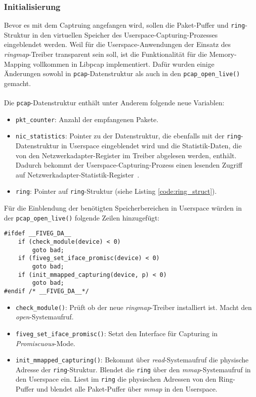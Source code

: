 \subsubsection*{Initialisierung}
Bevor es mit dem Captruing angefangen wird, sollen die Paket-Puffer und
\verb+ring+-Struktur in den virtuellen Speicher des
Userspace-Capturing-Prozesses eingeblendet werden. Weil für die Userspace-Anwendungen
der Einsatz des \emph{ringmap}-Treiber transparent sein soll, ist die Funktionalität für 
die Memory-Mapping vollkommen in Libpcap implementiert. Dafür wurden einige Änderungen 
sowohl in \verb+pcap+-Datenstruktur als auch in den \verb+pcap_open_live()+ gemacht.\\\\
%
Die \verb+pcap+-Datenstruktur enthält unter Anderem folgende neue Variablen: 
\begin{itemize}
	\item \verb+pkt_counter+: Anzahl der empfangenen Pakete.
	\item \verb+nic_statistics+: Pointer zu der Datenstruktur, die ebenfalls
		mit der \verb+ring+-Datenstruktur in Userspace eingeblendet wird und
		die Statistik-Daten, die von den Netzwerkadapter-Register im Treiber abgelesen
		werden, enthält. Dadurch bekommt der Userspace-Capturing-Prozess einen
		lesenden Zugriff auf Netzwerkadapter-Statistik-Register~\cite{e1000_sdm}.
	\item \verb+ring+: Pointer auf \verb+ring+-Struktur (siehe Listing
		\ref{code:ring_struct}).
\end{itemize}
%
Für die Einblendung der benötigten Speicherbereichen in Userspace 
würden in der \verb+pcap_open_live()+ folgende Zeilen hinzugefügt:
\begin{lstlisting}[frame=single, caption={Initiierung von Memory-Mapping}, captionpos={b}, label={code:code_libpcap_memmap}]
#ifdef __FIVEG_DA__ 
	if (check_module(device) < 0)
		goto bad;
	if (fiveg_set_iface_promisc(device) < 0)
		goto bad;
	if (init_mmapped_capturing(device, p) < 0)
		goto bad;
#endif /* __FIVEG_DA__*/
\end{lstlisting}
\begin{itemize}
	\item \verb+check_module()+: Prüft ob der neue \emph{ringmap}-Treiber installiert ist. 
		Macht den \emph{open}-Systemaufruf.
	\item \verb+fiveg_set_iface_promisc()+: Setzt den Interface für Capturing
		in \emph{Promiscuous}-Mode.
	\item \verb+init_mmapped_capturing()+: Bekommt über \emph{read}-Systemaufruf die physische Adresse 
		der \verb+ring+-Struktur. Blendet die \verb+ring+ über den \emph{mmap}-Systemaufruf
		in den Userspace ein. Liest im \verb+ring+ die physischen Adressen von den Ring-Puffer und 
		blendet alle  Paket-Puffer über \emph{mmap} in den Userspace.
\end{itemize}

